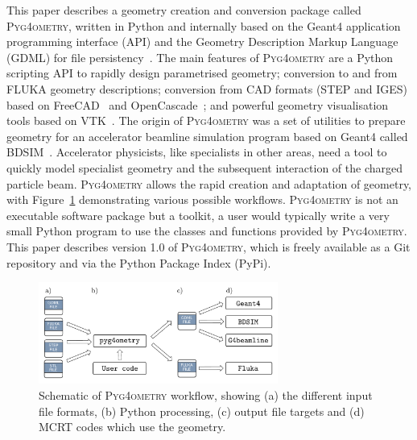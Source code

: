 \documentclass[final,5p,times,twocolumn]{elsarticle}
\newcommand{\PYGEOMETRY}{\textsc{Pyg4ometry}}
\begin{document}
This paper describes a geometry creation and conversion package called \PYGEOMETRY{}, written in Python and internally based on the Geant4 application
programming interface (API) and the Geometry Description Markup Language (GDML) for file persistency~\cite{GDML}. The main features of \PYGEOMETRY{}
are a Python scripting API to rapidly design parametrised geometry; conversion to and from  FLUKA geometry descriptions; conversion from CAD formats  (STEP
and IGES) based on FreeCAD~\cite{FreeCAD} and OpenCascade~\cite{OpenCASCADE}; and powerful geometry visualisation tools based on VTK~\cite{VTK4}. The
origin of \PYGEOMETRY{} was a set of utilities to prepare geometry for an accelerator beamline simulation program based on Geant4 called BDSIM~\cite{BDSIM_Nevay}.
Accelerator physicists, like specialists in other areas, need a tool to quickly model specialist geometry and the subsequent interaction of the charged particle beam.
\PYGEOMETRY{} allows the rapid creation and adaptation of geometry, with Figure~\ref{fig:workflow} demonstrating various possible workflows. \PYGEOMETRY{}
is not an executable software package but a toolkit, a user would typically write a very small Python program to use the classes and functions provided by
\PYGEOMETRY{}. This paper describes version 1.0 of \PYGEOMETRY{}, which is freely available as a Git repository and via the Python Package Index (PyPi).

\begin{figure}[hbt!]
  \normalsize
  \centering
  \includegraphics[width=0.7\textwidth]{./diagrams/workflow.pdf}
  \caption{\label{fig:workflow}Schematic of \PYGEOMETRY{} workflow, showing (a) the different input file formats, (b) Python processing, (c) output file targets and
  (d) MCRT codes which use the geometry. }
\end{figure}
\end{document}
